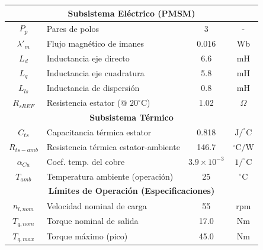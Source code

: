 \documentclass[12pt, a4paper,journal, onecolumn, compsoc]{IEEEtran}
\begin{document}
\begin{table}[htbp]
\begin{tabular}{|c|l|c|c|}
        \hline
        \multicolumn{4}{|c|}{\textbf{Subsistema Eléctrico (PMSM)}} \\
        \hline
        $P_p$ & Pares de polos & 3 & - \\
        $\lambda'_m$ & Flujo magnético de imanes & 0.016 & Wb \\
        $L_d$ & Inductancia eje directo & 6.6 & mH \\
        $L_q$ & Inductancia eje cuadratura & 5.8 & mH \\
        $L_{ls}$ & Inductancia de dispersión & 0.8 & mH \\
        $R_{sREF}$ & Resistencia estator (@ $20^\circ$C) & 1.02 & $\Omega$ \\
        \hline
        \multicolumn{4}{|c|}{\textbf{Subsistema Térmico}} \\
        \hline
        $C_{ts}$ & Capacitancia térmica estator & 0.818 & $\text{J}/^\circ\text{C}$ \\
        $R_{ts-amb}$ & Resistencia térmica estator-ambiente & 146.7 & $^\circ\text{C}/\text{W}$ \\
        $\alpha_{Cu}$ & Coef. temp. del cobre & $3.9 \times 10^{-3}$ & $1/^\circ\text{C}$ \\
        $T_{amb}$ & Temperatura ambiente (operación) & 25 & $^\circ\text{C}$ \\
        \hline
        \multicolumn{4}{|c|}{\textbf{Límites de Operación (Especificaciones)}} \\
        \hline
        $n_{l,nom}$ & Velocidad nominal de carga & 55 & rpm \\
        $T_{q,nom}$ & Torque nominal de salida & 17.0 & Nm \\
        $T_{q,max}$ & Torque máximo (pico) & 45.0 & Nm \\
        \hline
    \end{tabular}
    \label{tab:parametros}
\end{table}
\end{document}
